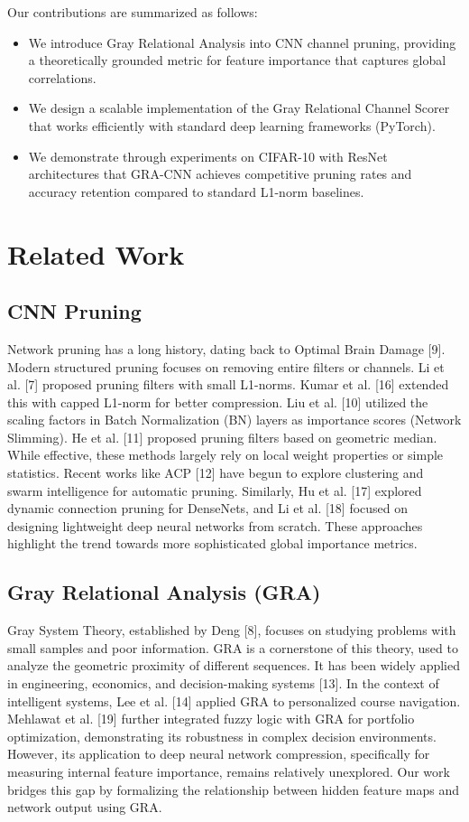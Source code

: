 \documentclass[sn-mathphys,Numbered]{sn-jnl}
\theoremstyle{thmstyleone}%
\theoremstyle{thmstyletwo}%
\theoremstyle{thmstylethree}%
\begin{document}
Our contributions are summarized as follows:
\begin{itemize}
    \item We introduce Gray Relational Analysis into CNN channel pruning, providing a theoretically grounded metric for feature importance that captures global correlations.
    \item We design a scalable implementation of the Gray Relational Channel Scorer that works efficiently with standard deep learning frameworks (PyTorch).
    \item We demonstrate through experiments on CIFAR-10 with ResNet architectures that GRA-CNN achieves competitive pruning rates and accuracy retention compared to standard L1-norm baselines.
\end{itemize}

\section{Related Work}\label{sec2}

\subsection{CNN Pruning}
Network pruning has a long history, dating back to Optimal Brain Damage [9]. Modern structured pruning focuses on removing entire filters or channels. Li et al. [7] proposed pruning filters with small L1-norms. Kumar et al. [16] extended this with capped L1-norm for better compression. Liu et al. [10] utilized the scaling factors in Batch Normalization (BN) layers as importance scores (Network Slimming). He et al. [11] proposed pruning filters based on geometric median. While effective, these methods largely rely on local weight properties or simple statistics. Recent works like ACP [12] have begun to explore clustering and swarm intelligence for automatic pruning. Similarly, Hu et al. [17] explored dynamic connection pruning for DenseNets, and Li et al. [18] focused on designing lightweight deep neural networks from scratch. These approaches highlight the trend towards more sophisticated global importance metrics.

\subsection{Gray Relational Analysis (GRA)}
Gray System Theory, established by Deng [8], focuses on studying problems with small samples and poor information. GRA is a cornerstone of this theory, used to analyze the geometric proximity of different sequences. It has been widely applied in engineering, economics, and decision-making systems [13]. In the context of intelligent systems, Lee et al. [14] applied GRA to personalized course navigation. Mehlawat et al. [19] further integrated fuzzy logic with GRA for portfolio optimization, demonstrating its robustness in complex decision environments. However, its application to deep neural network compression, specifically for measuring internal feature importance, remains relatively unexplored. Our work bridges this gap by formalizing the relationship between hidden feature maps and network output using GRA.
\end{document}
